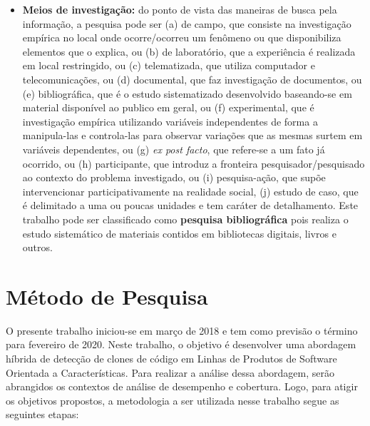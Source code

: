 \begin{itemize}
	\item \textbf{Meios de investigação:} do ponto de vista das maneiras de busca pela informação, a pesquisa pode ser (a) de campo, que consiste na investigação empírica no local onde ocorre/ocorreu um fenômeno ou que disponibiliza elementos que o explica, ou (b) de laboratório, que a experiência é realizada em local restringido, ou (c) telematizada, que utiliza computador e telecomunicações, ou (d) documental, que faz investigação de documentos, ou (e) bibliográfica, que é o estudo sistematizado desenvolvido baseando-se em material disponível ao publico em geral, ou (f) experimental, que é investigação empírica utilizando variáveis independentes de forma a manipula-las e controla-las para observar variações que as mesmas surtem em variáveis dependentes, ou (g) \textit{ex post facto}, que refere-se a um fato já ocorrido, ou (h) participante, que introduz a fronteira pesquisador/pesquisado ao contexto do problema investigado, ou (i) pesquisa-ação, que supõe intervencionar participativamente na realidade social, (j) estudo de caso, que é delimitado a uma ou poucas unidades e tem caráter de detalhamento. Este trabalho pode ser classificado como \textbf{pesquisa bibliográfica} pois realiza o estudo sistemático de materiais contidos em bibliotecas digitais, livros e outros.
	
\end{itemize}

\section{Método de Pesquisa}

O presente trabalho iniciou-se em março de 2018 e tem como previsão o término para fevereiro de 2020. Neste trabalho, o objetivo é desenvolver uma abordagem híbrida de detecção de clones de código em Linhas de Produtos de Software Orientada a Características. Para realizar a análise dessa abordagem, serão abrangidos os contextos de análise de desempenho e cobertura. Logo, para atigir os objetivos propostos, a metodologia a ser utilizada nesse trabalho segue as seguintes etapas:

